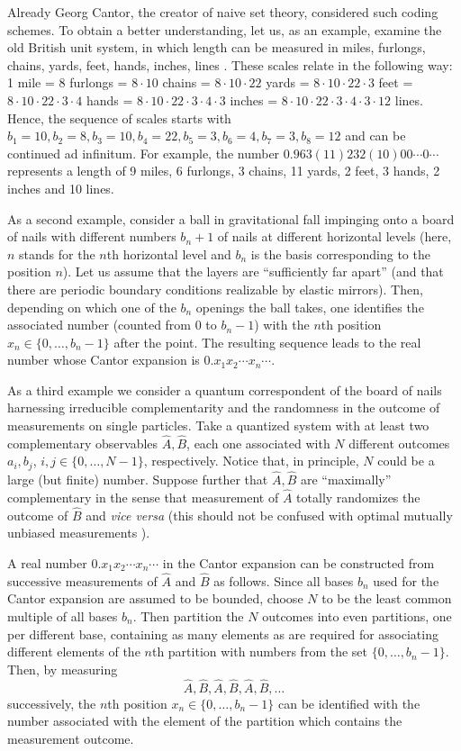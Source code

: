 \documentclass{elsart}
\begin{document}
Already Georg Cantor, the creator of naive set theory, considered
such coding schemes.
To obtain a better understanding, let us, as an example,
examine  the old British unit system, in which
length can be measured in miles, furlongs, chains, yards, feet, hands,
inches, lines \cite{drobot}. These scales relate in the following way:  1 mile = 8
furlongs = $8 \cdot 10$ chains =
$8 \cdot 10 \cdot 22$ yards =  $8 \cdot 10 \cdot 22 \cdot 3$ feet = $8 \cdot
10 \cdot 22 \cdot 3
\cdot 4$ hands = $8 \cdot 10 \cdot 22 \cdot 3
\cdot 4 \cdot 3$ inches  =  $8 \cdot 10 \cdot 22 \cdot 3
\cdot 4 \cdot 3 \cdot 12$ lines. Hence,  the sequence of  scales starts with
$b_1 = 10, b_2 = 8, b_3 = 10, b_4 = 22,  b_5 = 3, b_6 = 4, b_7 =3, b_8 = 12$
and can be continued ad infinitum.  For example,  the number $0.963
(11)232(10)00\cdots 0 \cdots$
represents a length of 9 miles, 6 furlongs, 3 chains, 11 yards, 2 feet, 3
hands,  2 inches and 10 lines.


As a second example,  consider a ball in gravitational fall
impinging onto a  board of nails with different numbers
$ b_n+1$ of nails
at different horizontal levels
(here, $n$ stands for the $n$th horizontal level
and $b_n$ is the basis corresponding to the position $n$).
Let us assume that the layers are ``sufficiently far apart''
(and that there are periodic boundary conditions realizable by
elastic mirrors).
Then, depending on which one of the $b_n$ openings the ball takes,
one identifies the associated number
(counted from $0$ to $b_n-1$) with
the $n$th position  $x_n \in \{0,\ldots ,b_n-1\}$ after the point.
The resulting sequence leads to the real number  whose Cantor expansion
is $0.x_1x_2\cdots x_n \cdots $.




As a third example we consider a quantum correspondent of  the  board of
nails
harnessing irreducible complementarity and the randomness  in the outcome of
measurements on single  particles.
Take a quantized system with at least two  complementary
observables
$\hat{A},\hat{B}$,
each one associated with $N$ different outcomes $a_i,b_j$, $i,j \in
\{0,\ldots ,N-1\}$, respectively.
Notice that, in principle, $N$ could be a large (but finite) number.
Suppose further that $\hat{A},\hat{B}$ are ``maximally''  complementary
in the sense that measurement of $\hat{A}$ totally randomizes the outcome
of $\hat{B}$ and {\it vice versa}
(this should not be confused with optimal mutually unbiased measurements
\cite{WooFie}).

A real number $0.x_1x_2\cdots x_n \cdots $ in the Cantor expansion
can be constructed from successive  measurements of $\hat{A}$
and $\hat{B}$ as follows.
Since all bases $b_n$ used for the Cantor
expansion are assumed to be bounded, choose $N$ to be
the least common multiple of all bases $b_n$.
Then partition the $N$ outcomes into even partitions,
one per different base,
containing as many elements as are required for
associating different elements of the $n$th partition
with  numbers from the set  $\{0,\ldots ,b_n-1\}$.
Then, by measuring
$$\hat{A},\hat{B},\hat{A},\hat{B},\hat{A},\hat{B},\ldots$$
successively, the $n$th position  $x_n \in \{0,\ldots ,b_n-1\}$
can be identified
with the number associated with the element of the partition which
contains the measurement outcome.
\end{document}
